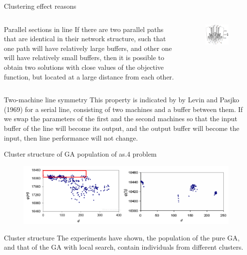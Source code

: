 \documentclass[aspectratio=169,xcolor=dvipsnames]{beamer}
\begin{document}
\begin{frame}{Clustering effect reasons}
\begin{columns}
    \begin{block}{Parallel sections in line}
        If there are two parallel paths that are identical in their network structure,
such that one path will have relatively large buffers, and other one will have relatively small buffers, then 
it is possible to obtain two solutions with close values of the objective function, but located at a large distance from each other.
    \end{block}
     \begin{figure}
    \includegraphics[scale=0.6]{test}
    \end{figure}
 \end{columns}
    \begin{block}{Two-machine line symmetry}
        This property is indicated by  by Levin and Pasjko
(1969) for a serial line,
consisting of two machines and a buffer
between them. If we swap the parameters of the first and the second machines so 
that the input buffer of the line will become its output, and the output buffer will become the input, then
line performance will not change.
    \end{block}
   
\end{frame}

\begin{frame}{Cluster structure of GA population of as.4 problem}
    \vspace{-0.5cm}
    \begin{figure}
    \includegraphics[scale=0.5]{ga_klasters}
    \end{figure}
        \begin{block}{Cluster structure}
 The experiments have shown, the population of the pure GA, and that of the GA with local search, contain individuals from different clusters.
    \end{block}
\end{frame}
\end{document}
